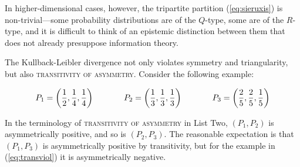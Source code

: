 \documentclass[11pt]{article}
\begin{document}
In higher-dimensional cases, however, the tripartite partition
(\ref{eq:sieruxis}) is non-trivial---some probability distributions
are of the $Q$-type, some are of the $R$-type, and it is difficult to
think of an epistemic distinction between them that does not already
presuppose information theory.

The Kullback-Leibler divergence not only violates symmetry and
triangularity, but also \textsc{transitivity of asymmetry}. Consider
the following example:

\begin{equation}
  \label{eq:transviol}
  P_{1}=\left(\frac{1}{2},\frac{1}{4},\frac{1}{4}\right)  \hspace{.5in}
  P_{2}=\left(\frac{1}{3},\frac{1}{3},\frac{1}{3}\right) \hspace{.5in}
  P_{3}=\left(\frac{2}{5},\frac{2}{5},\frac{1}{5}\right)
\end{equation}

In the terminology of \textsc{transitivity of asymmetry} in List Two,
$(P_{1},P_{2})$ is asymmetrically positive, and so is $(P_{2},P_{3})$.
The reasonable expectation is that $(P_{1},P_{3})$ is asymmetrically
positive by transitivity, but for the example in (\ref{eq:transviol})
it is asymmetrically negative.


 

\end{document}
